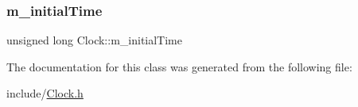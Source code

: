 \subsubsection{\texorpdfstring{m\+\_\+initial\+Time}{m\_initialTime}}
{\footnotesize\ttfamily unsigned long Clock\+::m\+\_\+initial\+Time\hspace{0.3cm}{\ttfamily [private]}}



The documentation for this class was generated from the following file\+:\begin{DoxyCompactItemize}
\item 
include/\hyperlink{_clock_8h}{Clock.\+h}\end{DoxyCompactItemize}
